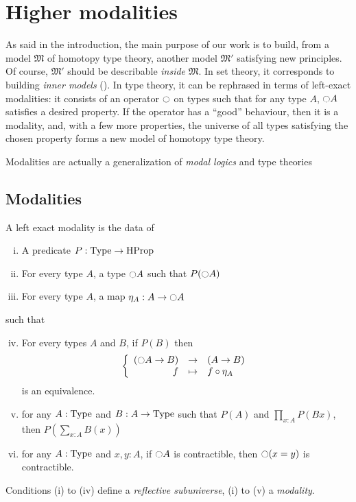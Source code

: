 \chapter{Higher modalities}
\label{chap:modalities}

As said in the introduction, the main purpose of our work is to build,
from a model $\mathfrak M$ of homotopy type theory, another model
$\mathfrak M'$ satisfying new principles. Of course, $\mathfrak M'$
should be describable {\em inside} $\mathfrak M$. In set theory, it
corresponds to building {\em inner models} (\cite{kunen}).%
%
In type theory, it can be rephrased in terms of left-exact modalities:
it consists of an operator $\ocircle$ on types such that for any type
$A$, $\ocircle A$ satisfies a desired property. If the operator has a
``good'' behaviour, then it is a modality, and, with a few more
properties, the universe of all types satisfying the chosen property
forms a new model of homotopy type theory.

Modalities are actually a generalization of {\em modal logics} and
{\modal type theories}~\cite{moggi-monad}

\section{Modalities}
\label{sec:modalities}

\begin{defi}
  \label{def:modality}
  A left exact modality is the data of
  \begin{enumerate}[(i)]
  \item A predicate $P:\operatorname{Type} \to \operatorname{HProp}$
  \item For every type $A$, a type
    $\ocircle A$ such that $P(\ocircle A)$
  \item For every type $A$, a map $\eta_A:A \to
    \ocircle A$
  \end{enumerate}
  such that
  \begin{enumerate}[(i)]
    \setcounter{enumi}{3}
  \item For every types $A$ and $B$, if $P(B)$ then
    \[ \left\{
        \begin{array}{rcl}
          (\ocircle A \to B) & \to & (A \to B) \\
          f & \mapsto & f \circ \eta_A
        \end{array} \right. \] %
    is an equivalence.
  \item for any $A:\operatorname{Type}$ and $B:A \to \operatorname{Type}$ such that $P(A)$
    and $\prod_{x:A} P(B x)$, then $P\left( \sum_{x:A} B(x)\right)$
  \item for any $A:\operatorname{Type}$ and $x,y:A$, if $\ocircle A$ is
    contractible, then $\ocircle (x=y)$ is contractible.
  \end{enumerate}
  Conditions (i) to (iv) define a {\em reflective subuniverse}, (i) to
  (v) a {\em modality}.
\end{defi}

